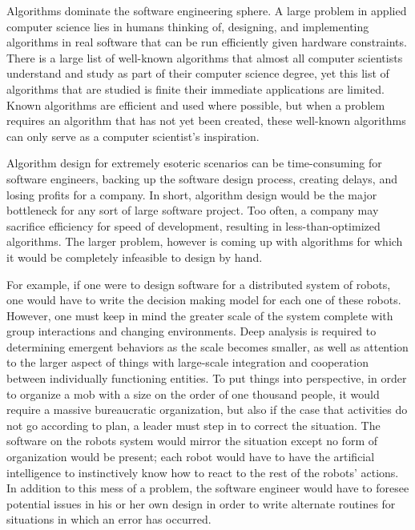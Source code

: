\documentclass[letterpaper, 10pt]{article}
\begin{document}
	Algorithms dominate the software engineering sphere. A large problem in applied computer science lies in humans thinking of, designing, and implementing algorithms in real software that can be run efficiently given hardware constraints. There is a large list of well-known algorithms that almost all computer scientists understand and study as part of their computer science degree, yet this list of algorithms that are studied is finite their immediate applications are limited. Known algorithms are efficient and used where possible, but when a problem requires an algorithm that has not yet been created, these well-known algorithms can only serve as a computer scientist's inspiration.
	
	Algorithm design for extremely esoteric scenarios can be time-consuming for software engineers, backing up the software design process, creating delays, and losing profits for a company. In short, algorithm design would be the major bottleneck for any sort of large software project. Too often, a company may sacrifice efficiency for speed of development, resulting in less-than-optimized algorithms. The larger problem, however is coming up with algorithms for which it would be completely infeasible to design by hand.
	
	For example, if one were to design software for a distributed system of robots, one would have to write the decision making model for each one of these robots. However, one must keep in mind the greater scale of the system complete with group interactions and changing environments. Deep analysis is required to determining emergent behaviors as the scale becomes smaller, as well as attention to the larger aspect of things with large-scale integration and cooperation between individually functioning entities. To put things into perspective, in order to organize a mob with a size on the order of one thousand people, it would require a massive bureaucratic organization, but also if the case that activities do not go according to plan, a leader must step in to correct the situation. The software on the robots system would mirror the situation except no form of organization would be present; each robot would have to have the artificial intelligence to instinctively know how to react to the rest of the robots' actions. In addition to this mess of a problem, the software engineer would have to foresee potential issues in his or her own design in order to write alternate routines for situations in which an error has occurred.
	
\end{document}
